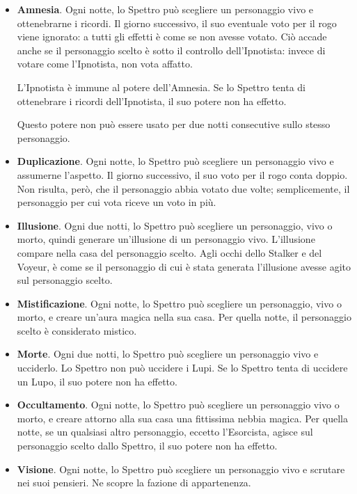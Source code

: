 \documentclass[a4paper,10pt]{article}
\begin{document}
\begin{itemize}
 \item {\bf Amnesia}. Ogni notte, lo Spettro può scegliere un personaggio vivo e
ottenebrarne i ricordi. Il giorno successivo, il suo eventuale voto per il rogo
viene ignorato: a tutti gli effetti è come se non avesse votato. Ciò accade
anche se il personaggio scelto è sotto il controllo dell'Ipnotista: invece di
votare come l'Ipnotista, non vota affatto.
 
 L'Ipnotista è immune al potere dell'Amnesia. Se lo Spettro tenta di ottenebrare
i ricordi dell'Ipnotista, il suo potere non ha effetto.
 
 Questo potere non può essere usato per due notti consecutive sullo stesso
personaggio.

 \item {\bf Duplicazione}. Ogni notte, lo Spettro può scegliere un personaggio
vivo e assumerne l'aspetto. Il giorno successivo, il suo voto per il rogo conta
doppio. Non risulta, però, che il personaggio abbia votato due volte;
semplicemente, il personaggio per cui vota riceve un voto in più.

 \item {\bf Illusione}. Ogni due notti, lo Spettro può scegliere un personaggio,
vivo o morto, quindi generare un'illusione di un personaggio vivo. L'illusione compare
nella casa del personaggio scelto.
 Agli occhi dello Stalker e del Voyeur, è come se il personaggio di cui è stata
generata l'illusione avesse agito sul personaggio scelto.

 \item {\bf Mistificazione}. Ogni notte, lo Spettro può scegliere un personaggio,
vivo o morto, e creare un'aura magica nella sua casa. Per quella notte, il
personaggio scelto è considerato mistico. 
 
 \item {\bf Morte}. Ogni due notti, lo Spettro può scegliere un personaggio vivo
e ucciderlo.
 Lo Spettro non può uccidere i Lupi. Se lo Spettro tenta di uccidere un Lupo,
il suo potere non ha effetto.
 
 \item {\bf Occultamento}. Ogni notte, lo Spettro può scegliere un personaggio
vivo o morto, e creare attorno alla sua casa una fittissima nebbia magica. Per
quella notte, se un qualsiasi altro personaggio, eccetto l'Esorcista, agisce sul
personaggio scelto dallo Spettro, il suo potere non ha effetto.
 
 \item {\bf Visione}. Ogni notte, lo Spettro può scegliere un personaggio vivo e
scrutare nei suoi pensieri. Ne scopre la fazione di appartenenza.
 
\end{itemize}
\end{document}
